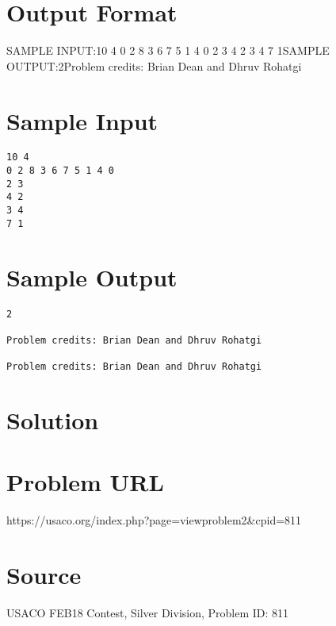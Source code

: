 \documentclass[12pt]{article}
\begin{document}
\section*{Output Format}
SAMPLE INPUT:10 4
0 2 8 3 6 7 5 1 4 0
2 3
4 2
3 4
7 1SAMPLE OUTPUT:2Problem credits: Brian Dean and Dhruv Rohatgi

\section*{Sample Input}
\begin{verbatim}
10 4
0 2 8 3 6 7 5 1 4 0
2 3
4 2
3 4
7 1
\end{verbatim}

\section*{Sample Output}
\begin{verbatim}
2

Problem credits: Brian Dean and Dhruv Rohatgi

Problem credits: Brian Dean and Dhruv Rohatgi
\end{verbatim}

\section*{Solution}


\section*{Problem URL}
https://usaco.org/index.php?page=viewproblem2&cpid=811

\section*{Source}
USACO FEB18 Contest, Silver Division, Problem ID: 811
\end{document}
